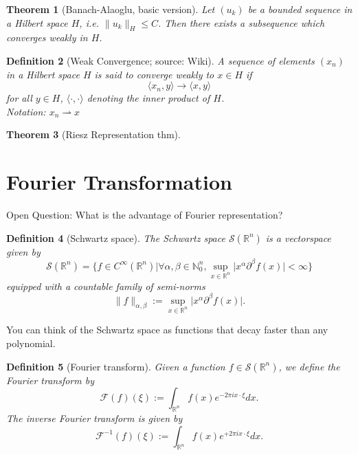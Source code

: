 \documentclass[12pt,a4paper]{article}
\newtheorem{definition}{Definition}
\newtheorem{thm}[definition]{Theorem}
\newcommand{\Rn}{\mathbb{R}^n}
\begin{document}
\begin{thm}[Banach-Alaoglu, basic version]
Let $(u_k)$ be a bounded sequence in a Hilbert space $H$, i.e. $\lVert u_k \rVert_H \leq C$. Then there exists a subsequence which converges weakly in $H$.
\end{thm}

\begin{definition}[Weak Convergence; source: Wiki]
A sequence of elements $(x_n)$ in a Hilbert space $H$ is said to converge weakly to $x\in H$ if
\begin{equation}
\langle x_n, y \rangle \rightarrow \langle x, y \rangle
\end{equation}
for all $y\in H$, $\langle \cdot , \cdot \rangle$ denoting the inner product of $H$. \\
Notation: $x_n \rightharpoonup x$
\end{definition}

\begin{thm}[Riesz Representation thm]
\end{thm}

\section{Fourier Transformation}

Open Question: What is the advantage of Fourier representation?

\begin{definition}[Schwartz space]
The Schwartz space $\mathcal{S}(\mathbb{R}^n)$ is a vectorspace given by
\begin{equation}
\mathcal{S}(\mathbb{R}^n)=\{f\in C^{\infty}(\mathbb{R}^n)\lvert \forall \alpha,\beta\in \mathbb{N}^n_0, \sup_{x\in\mathbb{R}^n}\lvert x^{\alpha}\partial^{\beta}f(x)\rvert <\infty\}
\end{equation}
equipped with a countable family of semi-norms
\begin{equation}
\lVert f \rVert_{\alpha,\beta} := \sup_{x\in\mathbb{R}^n}\lvert x^{\alpha}\partial^{\beta}f(x)\rvert.
\end{equation}
\end{definition}

You can think of the Schwartz space as functions that decay faster than any polynomial.

\begin{definition}[Fourier transform]
Given a function $f\in \mathcal{S}(\mathbb{R}^n)$, we define the Fourier transform by
\begin{equation}
\mathcal{F}(f)(\xi):=\int_{\Rn} f(x)e^{-2\pi ix\cdot \xi} dx.
\end{equation}
The inverse Fourier transform is given by
\begin{equation}
\mathcal{F}^{-1}(f)(\xi):=\int_{\Rn} f(x)e^{+2\pi ix\cdot \xi} dx.
\end{equation}
\end{definition}
\end{document}
